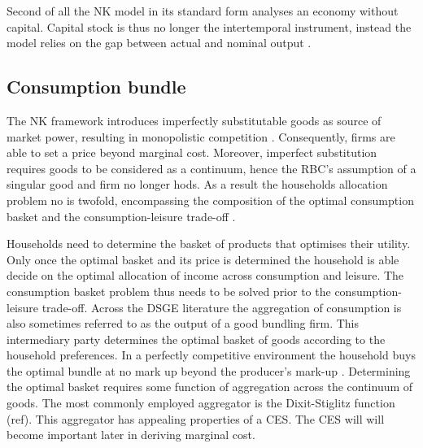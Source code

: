 \documentclass[12pt,a4paper,english]{article} %
\begin{document}
	Second of all the NK model in its standard form analyses an economy without capital. Capital stock is thus no longer the intertemporal instrument, instead the model relies on the gap between actual and nominal output \cite{gali_monetary_2008}.
		
	\subsection{Consumption bundle} \label{nk_bundle}
	The \ac{NK} framework introduces imperfectly substitutable goods as source of market power, resulting in monopolistic competition \cite{gali_monetary_2008}. Consequently, firms are able to set a price beyond marginal cost. Moreover, imperfect substitution requires goods to be considered as a continuum, hence the RBC's assumption of a singular good and firm no longer hods. As a result the households allocation problem no is twofold, encompassing the composition of the optimal consumption basket and the consumption-leisure trade-off \cite{gali_monetary_2008}.
	
	Households need to determine the basket of products that optimises their utility. Only once the optimal basket and its price is determined the household is able decide on the optimal allocation of income across consumption and leisure. The consumption basket problem thus needs to be solved prior to the consumption-leisure trade-off. Across the DSGE literature the aggregation of consumption is also sometimes referred to as the output of a good bundling firm. This intermediary party determines the optimal basket of goods according to the household preferences. In a perfectly competitive environment the household buys the optimal bundle at no mark up beyond the producer's mark-up \cite{gali_monetary_2008}.
	Determining the optimal basket requires some function of aggregation across the continuum of goods. The most commonly employed aggregator is the Dixit-Stiglitz function (ref). This aggregator has appealing properties of a \ac{CES}. The CES will will become important later in deriving marginal cost.
	
\end{document}
